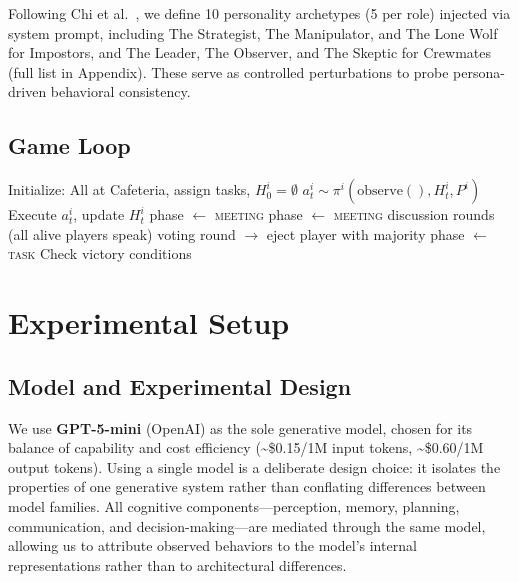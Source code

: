 \documentclass{article}
\begin{document}
Following Chi et al.~\cite{chi2024amongagents}, we define 10 personality archetypes (5 per role) injected via system prompt, including The Strategist, The Manipulator, and The Lone Wolf for Impostors, and The Leader, The Observer, and The Skeptic for Crewmates (full list in Appendix). These serve as controlled perturbations to probe persona-driven behavioral consistency.

\subsection{Game Loop}

\begin{algorithm}[h]
\caption{Multi-Agent Among Us Simulation}
\label{alg:game}
\begin{algorithmic}[1]
\STATE Initialize: All at Cafeteria, assign tasks, $H^i_0 = \emptyset$
            \STATE $a^i_t \sim \pi^i(\text{observe}(), H^i_t, P^i)$
            \STATE Execute $a^i_t$, update $H^i_t$
                \STATE phase $\leftarrow$ \textsc{meeting}
            \ENDIF
        \ENDFOR
            \STATE phase $\leftarrow$ \textsc{meeting}
        \ENDIF
    \ELSE
         discussion rounds (all alive players speak)
         voting round $\to$ eject player with majority
        \STATE phase $\leftarrow$ \textsc{task}
    \ENDIF
    \STATE Check victory conditions
\ENDWHILE
\end{algorithmic}
\end{algorithm}

\section{Experimental Setup}

\subsection{Model and Experimental Design}

We use \textbf{GPT-5-mini} (OpenAI) as the sole generative model, chosen for its balance of capability and cost efficiency (\textasciitilde\$0.15/1M input tokens, \textasciitilde\$0.60/1M output tokens). Using a single model is a deliberate design choice: it isolates the properties of one generative system rather than conflating differences between model families. All cognitive components---perception, memory, planning, communication, and decision-making---are mediated through the same model, allowing us to attribute observed behaviors to the model's internal representations rather than to architectural differences.
\end{document}
